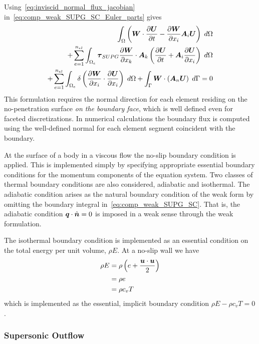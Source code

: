 Using~\eqref{eq:inviscid_normal_flux_jacobian} in~\eqref{eq:comp_weak_SUPG_SC_Euler_parts} gives
\begin{eqnarray}
  \label{eq:comp_weak_SUPG_SC_Euler_parts_implicit}
  \int_\Omega  \left({\boldsymbol{W}}\cdot{\frac{\partial{{\boldsymbol{U}}}}{\partial{t}}} - {\frac{\partial{{\boldsymbol{W}}}}{\partial{x_i}}}{\boldsymbol{A}}_i{\boldsymbol{U}} \right) \; d\Omega \nonumber \\
  + \sum_{e=1}^{n_{el}} \int_{\Omega_e} {\boldsymbol{\tau}}_{SUPG} {\frac{\partial{{\boldsymbol{W}}}}{\partial{x_k}}}\cdot{\boldsymbol{A}}_k
  \left( {\frac{\partial{{\boldsymbol{U}}}}{\partial{t}}} + {\boldsymbol{A}}_i {\frac{\partial{{\boldsymbol{U}}}}{\partial{x_i}}} \right) \; d\Omega  \nonumber \\
  + \sum_{e=1}^{n_{el}} \int_{\Omega_e} \delta \left({\frac{\partial{{\boldsymbol{W}}}}{\partial{x_i}}}\cdot{\frac{\partial{{\boldsymbol{U}}}}{\partial{x_i}}}\right)\; d\Omega
  + \int_\Gamma {\boldsymbol{W}}\cdot\left({\boldsymbol{A}}_n{\boldsymbol{U}}\right) \; d\Gamma = 0
\end{eqnarray}
This formulation requires the normal direction for each element residing on the no-penetration surface \emph{on the boundary face}, which is well defined even for faceted discretizations.  In numerical calculations the boundary flux is computed using the well-defined normal for each element segment coincident with the boundary.

At the surface of a body in a viscous flow the no-slip boundary condition is applied.  This is implemented simply by specifying appropriate essential boundary conditions for the momentum components of the equation system.    Two classes of thermal boundary conditions are also considered, adiabatic and isothermal.  The adiabatic condition arises as the natural boundary condition of the weak form by omitting the boundary integral in~\eqref{eq:comp_weak_SUPG_SC}.  That is, the adiabatic condition ${\boldsymbol{q}}\cdot\hat{{\boldsymbol{n}}} = 0$ is imposed in a weak sense through the weak formulation. 

The isothermal boundary condition is implemented as an essential condition on the total energy per unit volume, $\rho E$. At a no-slip wall we have
\begin{align*}
  \rho E & = \rho \left(e + \frac{{\boldsymbol{u}}\cdot{\boldsymbol{u}}}{2}\right) \\
         & = \rho e \\
         & = \rho c_v T
\end{align*}
which is implemented as the essential, implicit boundary condition $\rho E - \rho c_v T = 0$.


\subsubsection{Supersonic Outflow}

